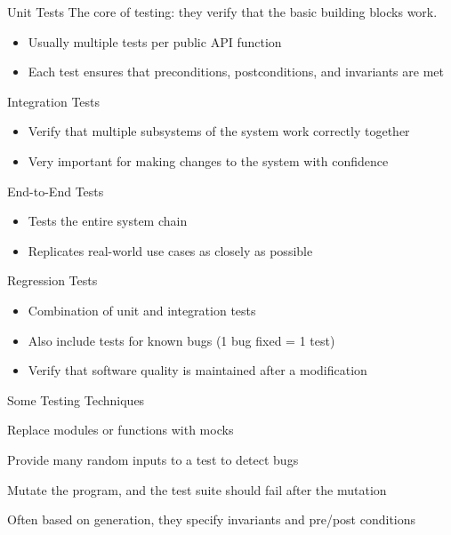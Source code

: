   \begin{frame}{Unit Tests}
  The core of testing: they verify that the basic building blocks work.
  
  \begin{itemize}[<+->]
  \item Usually multiple tests per \alert{public API function}
  \item Each test ensures that preconditions, postconditions, and invariants are met
  \end{itemize}
  \end{frame}
  
  \begin{frame}{Integration Tests}
  \begin{itemize}[<+->]
  \item Verify that multiple subsystems of the system work correctly together
  \item Very important for making changes to the system with confidence
  \end{itemize}
  \end{frame}
  
  \begin{frame}{End-to-End Tests}
  \begin{itemize}[<+->]
  \item Tests the entire system chain
  \item Replicates real-world use cases as closely as possible
  \end{itemize}
  \end{frame}
  
  \begin{frame}{Regression Tests}
  \begin{itemize}[<+->]
  \item Combination of unit and integration tests
  \item Also include tests for known bugs (1 bug fixed = 1 test)
  \item Verify that software quality is maintained after a modification
  \end{itemize}
  \end{frame}
  
  \begin{frame}{Some Testing Techniques}
  \begin{description}[<+->]
  \item[Mocking] Replace modules or functions with mocks
  \item[Generation] Provide many random inputs to a test to detect bugs
  \item[Mutation] Mutate the program, and the test suite should fail after the mutation
  \item[Contracts] Often based on generation, they specify invariants and pre/post conditions
  \end{description}
  \end{frame}
  

